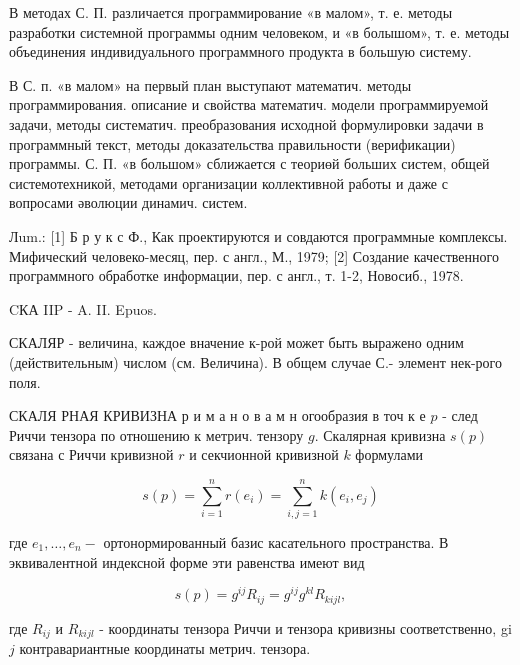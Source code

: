\documentclass[10pt]{article}
\begin{document}
В методах С. П. различается программирование «в малом», т. е. методы разработки системной программы одним человеком, и «в болышом», т. е. методы объединения индивидуального программного продукта в большую систему.



В С. п. «в малом» на первый план выступают математич. методы программирования. описание и свойства математич. модели программируемой задачи, методы систематич. преобразования исходной формулировки задачи в программный текст, методы доказательства правильности (верификации) программы. С. П. «в большом» сближается с теориөй больших систем, общей системотехникой, методами организации коллективной работы и даже с вопросами әволюции динамич. систем.



Лum.: [1] Б р у к с Ф., Как проектируются и совдаются программные комплексы. Мифический человеко-месяц, пер. с англ., М., 1979; [2] Создание качественного программного обработке информации, пер. с англ., т. 1-2, Новосиб., 1978.



CКА IIP - A. II. Epuos.



СКАЛЯР - величина, каждое вначение к-рой может быть выражено одним (действительным) числом (см. Величина). В общем случае С.- элемент нек-рого поля.



СКАЛЯ РНАЯ КРИВИЗНА р и м а н о в а м н огообразия в точ к е $p$ - след Риччи тензора по отношению к метрич. тензору $g$. Скалярная кривизна $s(p)$ связана с Риччи кривизной $r$ и секчионной кривизной $k$ формулами



\[

s(p)=\sum_{i=1}^{n} r\left(e_{i}\right)=\sum_{i, j=1}^{n} k\left(e_{i}, e_{j}\right)

\]



где $e_{1}, \ldots, e_{n}-$ ортонормированный базис касательного пространства. В эквивалентной индексной форме эти равенства имеют вид



\[

s(p)=g^{i j} R_{i j}=g^{i j} g^{k l} R_{k i j l},

\]



где $R_{i j}$ и $R_{k i j l}$ - координаты тензора Риччи и тензора кривизны соответственно, gi $j$ контравариантные координаты метрич. тензора.
\end{document}
